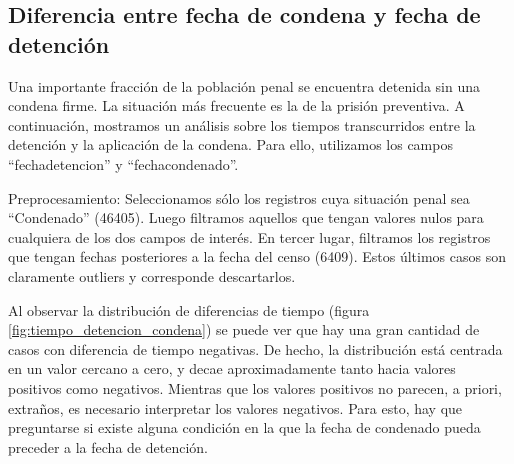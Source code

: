 \documentclass[10pt]{article}
\begin{document}
\subsection{Diferencia entre fecha de condena y fecha de detenci\'on}

Una importante fracci\'on de la poblaci\'on penal se encuentra detenida sin una condena firme. La situaci\'on m\'as frecuente es la de la prisi\'on preventiva. A continuaci\'on, mostramos un an\'alisis sobre los tiempos transcurridos entre la detenci\'on y la aplicaci\'on de la condena. Para ello, utilizamos los campos ``fecha\textunderscore detencion'' y ``fecha\textunderscore condenado''.

Preprocesamiento: Seleccionamos s\'olo los registros cuya situaci\'on penal sea ``Condenado'' (46405). Luego filtramos aquellos que tengan valores nulos para cualquiera de los dos campos de inter\'es. En tercer lugar, filtramos los registros que tengan fechas posteriores a la fecha del censo (6409). Estos \'ultimos casos son claramente outliers y corresponde descartarlos.

Al observar la distribuci\'on de diferencias de tiempo (figura \ref{fig:tiempo_detencion_condena}) se puede ver que hay una gran cantidad de casos con diferencia de tiempo negativas. De hecho, la distribuci\'on est\'a centrada en un valor cercano a cero, y decae aproximadamente tanto hacia valores positivos como negativos. Mientras que los valores positivos no parecen, a priori, extraños, es necesario interpretar los valores negativos. Para esto, hay que preguntarse si existe alguna condición en la que la fecha de condenado pueda preceder a la fecha de detención. 
\end{document}
